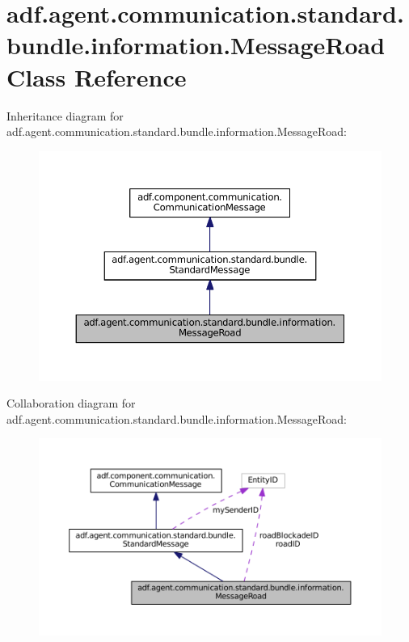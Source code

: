 \hypertarget{classadf_1_1agent_1_1communication_1_1standard_1_1bundle_1_1information_1_1MessageRoad}{}\section{adf.\+agent.\+communication.\+standard.\+bundle.\+information.\+Message\+Road Class Reference}
\label{classadf_1_1agent_1_1communication_1_1standard_1_1bundle_1_1information_1_1MessageRoad}


Inheritance diagram for adf.\+agent.\+communication.\+standard.\+bundle.\+information.\+Message\+Road\+:
\nopagebreak
\begin{figure}[H]
\begin{center}
\leavevmode
\includegraphics[width=350pt]{classadf_1_1agent_1_1communication_1_1standard_1_1bundle_1_1information_1_1MessageRoad__inherit__graph}
\end{center}
\end{figure}


Collaboration diagram for adf.\+agent.\+communication.\+standard.\+bundle.\+information.\+Message\+Road\+:
\nopagebreak
\begin{figure}[H]
\begin{center}
\leavevmode
\includegraphics[width=350pt]{classadf_1_1agent_1_1communication_1_1standard_1_1bundle_1_1information_1_1MessageRoad__coll__graph}
\end{center}
\end{figure}
